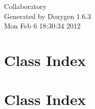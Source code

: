 \documentclass[a4paper]{book}
\begin{document}
\hypersetup{pageanchor=false}
\begin{titlepage}
\vspace*{7cm}
\begin{center}
{\Large Collaboratory }\\
\vspace*{1cm}
{\large Generated by Doxygen 1.6.3}\\
\vspace*{0.5cm}
{\small Mon Feb 6 18:30:34 2012}\\
\end{center}
\end{titlepage}
\clearemptydoublepage
{}
\tableofcontents
\clearemptydoublepage
{}
\hypersetup{pageanchor=true}
\chapter{Class Index}

\chapter{Class Index}

\end{document}
